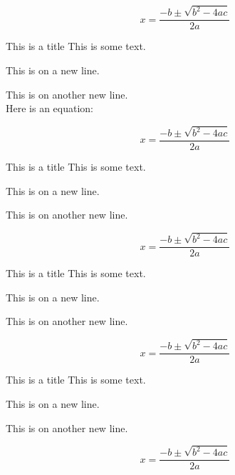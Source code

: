 



\lipsum[10]

\begin{equation*}
    x = \frac{-b \pm \sqrt{b^2 - 4ac}}{2a}
\end{equation*}

\begin{greybox}{This is a title}
    This is some text.

    This is on a new line.

    This is on another new line.\\
    Here is an equation:

    \begin{equation*}
        x = \frac{-b \pm \sqrt{b^2 - 4ac}}{2a}
    \end{equation*}
\end{greybox}

\begin{redbox}{This is a title}
    This is some text.

    This is on a new line.

    This is on another new line.

    \begin{equation*}
        x = \frac{-b \pm \sqrt{b^2 - 4ac}}{2a}
    \end{equation*}
\end{redbox}

\begin{bluebox}{This is a title}
    This is some text.

    This is on a new line.

    This is on another new line.

    \begin{equation*}
        x = \frac{-b \pm \sqrt{b^2 - 4ac}}{2a}
    \end{equation*}
\end{bluebox}

\begin{greenbox}{This is a title}
    This is some text.

    This is on a new line.

    This is on another new line.

    \begin{equation*}
        x = \frac{-b \pm \sqrt{b^2 - 4ac}}{2a}
    \end{equation*}
\end{greenbox}

